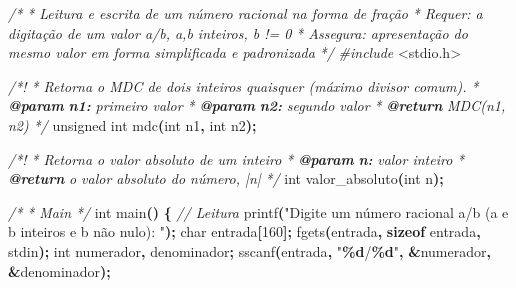 \documentclass[
  11pt,
  a4paper,
]{scrbook}
\newenvironment{Shaded}{\begin{snugshade}}{\end{snugshade}}
\newcommand{\AnnotationTok}[1]{\textcolor[rgb]{0.56,0.35,0.01}{\textbf{\textit{#1}}}}
\newcommand{\CommentTok}[1]{\textcolor[rgb]{0.56,0.35,0.01}{\textit{#1}}}
\newcommand{\CommentVarTok}[1]{\textcolor[rgb]{0.56,0.35,0.01}{\textbf{\textit{#1}}}}
\newcommand{\DataTypeTok}[1]{\textcolor[rgb]{0.13,0.29,0.53}{#1}}
\newcommand{\DecValTok}[1]{\textcolor[rgb]{0.00,0.00,0.81}{#1}}
\newcommand{\ImportTok}[1]{#1}
\newcommand{\KeywordTok}[1]{\textcolor[rgb]{0.13,0.29,0.53}{\textbf{#1}}}
\newcommand{\NormalTok}[1]{#1}
\newcommand{\OperatorTok}[1]{\textcolor[rgb]{0.81,0.36,0.00}{\textbf{#1}}}
\newcommand{\PreprocessorTok}[1]{\textcolor[rgb]{0.56,0.35,0.01}{\textit{#1}}}
\newcommand{\SpecialCharTok}[1]{\textcolor[rgb]{0.81,0.36,0.00}{\textbf{#1}}}
\newcommand{\StringTok}[1]{\textcolor[rgb]{0.31,0.60,0.02}{#1}}
\begin{document}
\begin{Shaded}
\begin{Highlighting}[numbers=left,,]
\CommentTok{/*}
\CommentTok{ * Leitura e escrita de um número racional na forma de fração}
\CommentTok{ * Requer: a digitação de um valor a/b, a,b inteiros, b != 0}
\CommentTok{ * Assegura: apresentação do mesmo valor em forma simplificada e padronizada}
\CommentTok{ */}
\PreprocessorTok{\#include }\ImportTok{\textless{}stdio.h\textgreater{}}

\CommentTok{/*!}
\CommentTok{ * Retorna o MDC de dois inteiros quaisquer (máximo divisor comum).}
\CommentTok{ * }\AnnotationTok{@param}\CommentTok{ }\CommentVarTok{n1:}\CommentTok{ primeiro valor}
\CommentTok{ * }\AnnotationTok{@param}\CommentTok{ }\CommentVarTok{n2:}\CommentTok{ segundo valor}
\CommentTok{ * }\AnnotationTok{@return}\CommentTok{ MDC(n1, n2)}
\CommentTok{ */}
\DataTypeTok{unsigned} \DataTypeTok{int}\NormalTok{ mdc}\OperatorTok{(}\DataTypeTok{int}\NormalTok{ n1}\OperatorTok{,} \DataTypeTok{int}\NormalTok{ n2}\OperatorTok{);}

\CommentTok{/*!}
\CommentTok{ * Retorna o valor absoluto de um inteiro}
\CommentTok{ * }\AnnotationTok{@param}\CommentTok{ }\CommentVarTok{n:}\CommentTok{ valor inteiro}
\CommentTok{ * }\AnnotationTok{@return}\CommentTok{ o valor absoluto do número, |n|}
\CommentTok{ */}
\DataTypeTok{int}\NormalTok{ valor\_absoluto}\OperatorTok{(}\DataTypeTok{int}\NormalTok{ n}\OperatorTok{);}

\CommentTok{/*}
\CommentTok{ * Main}
\CommentTok{ */}
\DataTypeTok{int}\NormalTok{ main}\OperatorTok{()} \OperatorTok{\{}
    \CommentTok{// Leitura}
\NormalTok{    printf}\OperatorTok{(}\StringTok{"Digite um número racional a/b (a e b inteiros e b não nulo): "}\OperatorTok{);}
    \DataTypeTok{char}\NormalTok{ entrada}\OperatorTok{[}\DecValTok{160}\OperatorTok{];}
\NormalTok{    fgets}\OperatorTok{(}\NormalTok{entrada}\OperatorTok{,} \KeywordTok{sizeof}\NormalTok{ entrada}\OperatorTok{,}\NormalTok{ stdin}\OperatorTok{);}
    \DataTypeTok{int}\NormalTok{ numerador}\OperatorTok{,}\NormalTok{ denominador}\OperatorTok{;}
\NormalTok{    sscanf}\OperatorTok{(}\NormalTok{entrada}\OperatorTok{,} \StringTok{"}\SpecialCharTok{\%d}\StringTok{/}\SpecialCharTok{\%d}\StringTok{"}\OperatorTok{,} \OperatorTok{\&}\NormalTok{numerador}\OperatorTok{,} \OperatorTok{\&}\NormalTok{denominador}\OperatorTok{);}


\end{Highlighting}
\end{Shaded}
\end{document}

